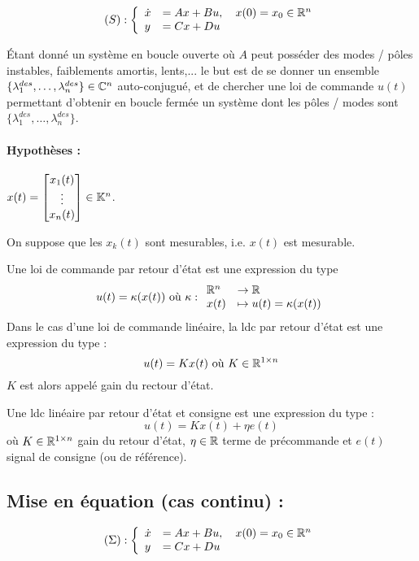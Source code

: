 \documentclass[main.tex]{subfiles}
\begin{document}
\[ (S) :
\left\{
\begin{array}{ll}
\dot{x} &= Ax + Bu, \quad x(0)=x_0 \in \mathbb{R}^n \\
y & = Cx+Du
\end{array}
\right.
\]

Étant donné un système en boucle ouverte où $A$ peut posséder des modes / pôles instables, faiblements amortis, lents,... le but est de se donner un ensemble $\{ \lambda_1^{des}, \dots, \lambda_n^{des}\}\in\mathbb{C}^n$ auto-conjugué, et de chercher une loi de commande $u(t)$ permettant d'obtenir en boucle fermée un système dont les pôles / modes sont  $\{ \lambda_1^{des}, \dots, \lambda_n^{des}\}$.

\paragraph{Hypothèses : } $x(t) = \begin{bmatrix} x_1(t) \\ \vdots \\ x_n(t) \end{bmatrix} \in \mathbb{K}^n$.

On suppose que les $x_k(t)$ sont mesurables, i.e. $x(t)$ est mesurable.\\

\begin{defin}
Une loi de commande par retour d'état est une expression du type
\[u(t) = \kappa (x(t)) \text{ où } \kappa : \begin{array}{ll}
\mathbb{R}^n & \rightarrow \mathbb{R} \\
x(t) & \mapsto u(t) = \kappa(x(t))
\end{array}
\]
Dans le cas d'une loi de commande linéaire, la ldc par retour d'état est une expression du type :
\[ u(t) = Kx(t) \text{ où } K\in \mathbb{R}^{1\times n} \]
$K$ est alors appelé gain du rectour d'état.

Une ldc linéaire par retour d'état et consigne est une expression du type :
\[ u(t) = Kx(t) + \eta e(t) \]
où $K\in \mathbb{R}^{1\times n}$ gain du retour d'état, $\eta \in \mathbb{R}$ terme de précommande et $e(t)$ signal de consigne (ou de référence).
\end{defin}

\subsection{Mise en équation (cas continu) :}
\[ (\Sigma) :
\left\{
\begin{array}{ll}
\dot{x} &= Ax + Bu, \quad x(0)=x_0 \in \mathbb{R}^n \\
y & = Cx+Du
\end{array}
\right.
\]
\end{document}
